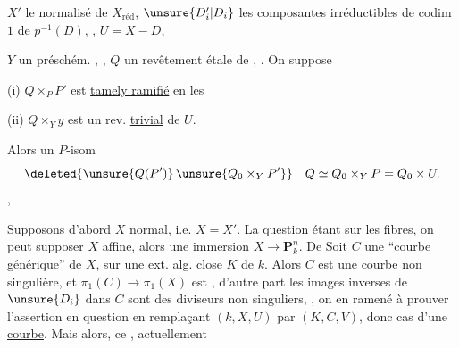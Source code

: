 $X'$ le normalisé de $X_{\mathrm{réd}}$,
$\unsure{D'_i|D_i}$ les composantes irréductibles de codim $1$ de
$p^{-1}(D)$,
,
$U=X-D$,

$Y$ un préschém. 
,
,
$Q$ un revêtement étale de
,
.
On suppose

(i) $Q\times_P P'$ est 
\uline{tamely ramifié} en les

(ii) $Q\times_Y y$ est un rev. \uline{trivial} de $U$.


Alors 
un $P$-isom
\[
\deleted{\unsure{Q(P')}\,\unsure{Q_0\times_Y P'}}\quad
Q\simeq Q_0\times_Y P=Q_0\times U.
\]
,

Supposons d'abord $X$ normal, i.e. $X=X'$.
 La question étant
 sur les fibres,
on peut supposer $X$ affine, alors  une immersion
$X\longrightarrow\mathbf P_k^n$.
De 
Soit $C$ une ``courbe générique'' de $X$,
sur une ext. alg. close $K$ de $k$.
Alors $C$ est une courbe non singulière, et
$\pi_1(C)\to\pi_1(X)$ est , d'autre part les images inverses
de $\unsure{D_i}$ dans $C$ sont des diviseurs non singuliers,
, on en 
ramené à prouver l'assertion en question en remplaçant $(k,X,U)$ par
$(K,C,V)$, donc cas d'une \uline{courbe}.
Mais alors, ce , actuellement

